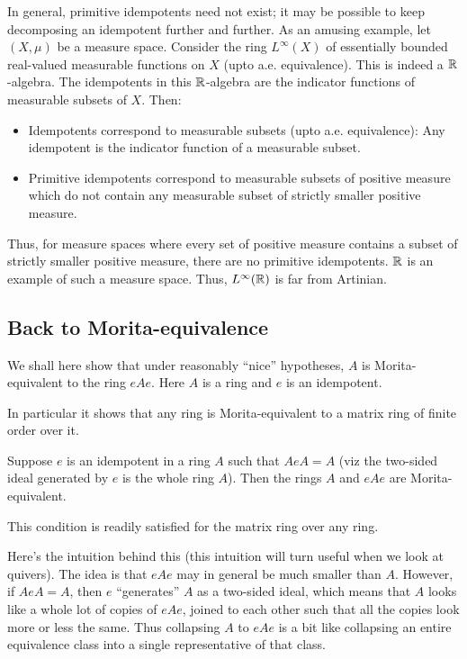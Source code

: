\documentclass[a4paper]{amsart}
\begin{document}
In general, primitive idempotents need not exist; it may be possible
to keep decomposing an idempotent further and further. As an amusing
example, let $(X,\mu)$ be a measure space. Consider the ring
$L^\infty(X)$ of essentially bounded real-valued measurable functions
on $X$ (upto a.e. equivalence). This is indeed a $\mathbb{R}$-algebra. The
idempotents in this $\mathbb{R}$-algebra are the indicator functions of
measurable subsets of $X$. Then:

\begin{itemize}

\item Idempotents correspond to measurable subsets (upto a.e. equivalence): Any idempotent is the indicator function of a measurable subset.

\item Primitive idempotents correspond to measurable subsets of
  positive measure which do not contain any measurable subset of
  strictly smaller positive measure.

\end{itemize}

Thus, for measure spaces where every set of positive measure contains
a subset of strictly smaller positive measure, there are no primitive
idempotents. $\mathbb{R}$ is an example of such a measure space. Thus,
$L^\infty(\mathbb{R})$ is far from Artinian.
 
\subsection{Back to Morita-equivalence}

We shall here show that under reasonably ``nice'' hypotheses, $A$ is
Morita-equivalent to the ring $eAe$. Here $A$ is a ring and $e$ is an
idempotent.

In particular it shows that any ring is Morita-equivalent to a matrix
ring of finite order over it.

\begin{theorem}
  Suppose $e$ is an idempotent in a ring $A$ such that $AeA = A$ (viz
  the two-sided ideal generated by $e$ is the whole ring $A$). Then
  the rings $A$ and $eAe$ are Morita-equivalent.
\end{theorem}

This condition is readily satisfied for the matrix ring over any ring.

Here's the intuition behind this (this intuition will turn useful when
we look at quivers). The idea is that $eAe$ may in general be much
smaller than $A$. However, if $AeA = A$, then $e$ ``generates'' $A$ as
a two-sided ideal, which means that $A$ looks like a whole lot of
copies of $eAe$, joined to each other such that all the copies look
more or less the same. Thus collapsing $A$ to $eAe$ is a bit like
collapsing an entire equivalence class into a single representative of
that class.
\end{document}
